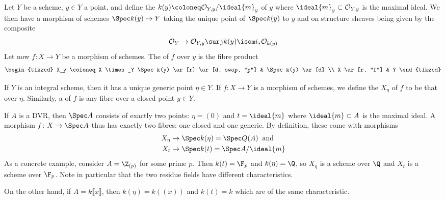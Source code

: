 \documentclass[wip, algebra]{bsteffan-lecturenotes}
\newcommand{\cO}{\mathcal{O}}
\begin{document}
\begin{definition}
	Let $Y$ be a scheme, $y \in Y$ a point, and define the  $k(y) \coloneq \cO_{Y, y} / \ideal{m}_y$ of $y$ where $\ideal{m}_y \subset \cO_{Y, y}$ is the maximal ideal.
	We then have a morphism of schemes $\Spec k(y) \to Y$ taking the unique point of $\Spec k(y)$ to $y$ and on structure sheaves being given by the composite 
	\begin{equation*}
		\cO_Y \to \cO_{Y, y} \surj k(y) \isom i_* \cO_{k(y)}
	\end{equation*}
	Let now $f\colon X \to Y$ be a morphism of schemes.
	The  of $f$ over $y$ is the fibre product
	\begin{equation}\label{diag:sch:fibre}
		\begin{tikzcd}
			X_y \coloneq X \times_Y \Spec k(y) 
					\ar[r]
					\ar[d, swap, "p"]
				& \Spec k(y)
					\ar[d]
			\\
			X
					\ar[r, "f"]
				& Y
		\end{tikzcd}
	\end{equation}
\end{definition}
\begin{definition}
	If $Y$ is an integral scheme, then it has a unique generic point $\eta \in Y$.
	If $f\colon X \to Y$ is a morphism of schemes, we define the  $X_\eta$ of $f$ to be that over $\eta$.
	Similarly, a  of $f$ is any fibre over a closed point $y \in Y$.
\end{definition}
\begin{example}
	If $A$ is a DVR, then $\Spec A$ consists of exactly two points: $\eta = (0)$ and $t = \ideal{m}$ where $\ideal{m} \subset A$ is the maximal ideal.
	A morphism $f\colon X \to \Spec A$ thus has exactly two fibres: one closed and one generic.
	By definition, these come with morphisms
	\begin{align*}
		X_\eta &\to \Spec k(\eta) = \Spec Q(A) \;\;\text{and}\\
		X_t &\to \Spec k(t) = \Spec A / \ideal{m}
	\end{align*}
	As a concrete example, consider $A = \Z_{(p)}$ for some prime $p$.
	Then $k(t) = \F_p$ and $k(\eta) = \Q$, so $X_\eta$ is a scheme over $\Q$ and $X_t$ is a scheme over $\F_p$.
	Note in particular that the two residue fields have different characteristics.

	On the other hand, if $A = k\llbracket x\rrbracket$, then $k(\eta) = k((x))$ and $k(t) = k$ which are of the same characteristic.
\end{example}
\end{document}
